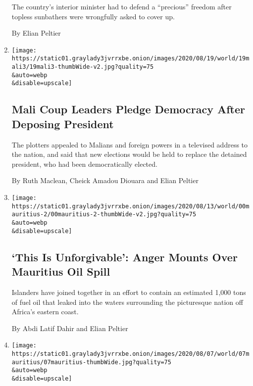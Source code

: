 \begin{enumerate}
  The country's interior minister had to defend a ``precious'' freedom
  after topless sunbathers were wrongfully asked to cover up.

  By Elian Peltier
\item
  \href{/2020/08/19/world/africa/mali-military-coup.html}{}

  \texttt{[image: https://static01.graylady3jvrrxbe.onion/images/2020/08/19/world/19mali3/19mali3-thumbWide-v2.jpg?quality=75\\\&auto=webp\\\&disable=upscale]}

  \hypertarget{mali-coup-leaders-pledge-democracy-after-deposing-president}{%
  \subsection{Mali Coup Leaders Pledge Democracy After Deposing
  President}\label{mali-coup-leaders-pledge-democracy-after-deposing-president}}

  The plotters appealed to Malians and foreign powers in a televised
  address to the nation, and said that new elections would be held to
  replace the detained president, who had been democratically elected.

  By Ruth Maclean, Cheick Amadou Diouara and Elian Peltier
\item
  \href{/2020/08/14/world/africa/mauritius-oil-spill.html}{}

  \texttt{[image: https://static01.graylady3jvrrxbe.onion/images/2020/08/13/world/00mauritius-2/00mauritius-2-thumbWide-v2.jpg?quality=75\\\&auto=webp\\\&disable=upscale]}

  \hypertarget{this-is-unforgivable-anger-mounts-over-mauritius-oil-spill}{%
  \subsection{`This Is Unforgivable': Anger Mounts Over Mauritius Oil
  Spill}\label{this-is-unforgivable-anger-mounts-over-mauritius-oil-spill}}

  Islanders have joined together in an effort to contain an estimated
  1,000 tons of fuel oil that leaked into the waters surrounding the
  picturesque nation off Africa's eastern coast.

  By Abdi Latif Dahir and Elian Peltier
\item
  \href{/2020/08/07/world/africa/mauritius-oil-spill.html}{}

  \texttt{[image: https://static01.graylady3jvrrxbe.onion/images/2020/08/07/world/07mauritius/07mauritius-thumbWide.jpg?quality=75\\\&auto=webp\\\&disable=upscale]}


\end{enumerate}
